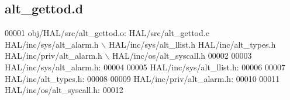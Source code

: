 \subsection{alt\+\_\+gettod.\+d}
\label{alt__gettod_8d_source}

\begin{DoxyCode}
00001 obj/HAL/src/alt\_gettod.o: HAL/src/alt\_gettod.c HAL/inc/sys/alt_alarm.h \(\backslash\)
 HAL/inc/sys/alt_llist.h HAL/inc/alt\_types.h HAL/inc/priv/alt_alarm.h \(\backslash\)
 HAL/inc/os/alt\_syscall.h
00002 
00003 HAL/inc/sys/alt_alarm.h:
00004 
00005 HAL/inc/sys/alt_llist.h:
00006 
00007 HAL/inc/alt\_types.h:
00008 
00009 HAL/inc/priv/alt_alarm.h:
00010 
00011 HAL/inc/os/alt\_syscall.h:
00012 \end{DoxyCode}
